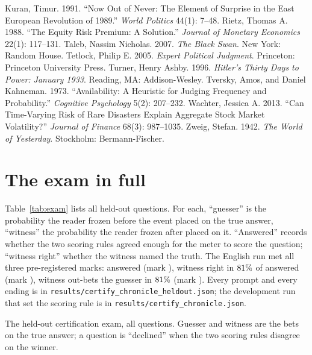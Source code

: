 \documentclass[11pt]{article}
\begin{document}
\begin{thebibliography}{99}
 Kuran, Timur. 1991. ``Now Out of Never: The Element of Surprise in the East
European Revolution of 1989.'' \emph{World Politics} 44(1): 7--48.
 Rietz, Thomas A. 1988. ``The Equity Risk Premium: A Solution.''
\emph{Journal of Monetary Economics} 22(1): 117--131.
 Taleb, Nassim Nicholas. 2007. \emph{The Black Swan}. New York: Random House.
 Tetlock, Philip E. 2005. \emph{Expert Political Judgment}. Princeton:
Princeton University Press.
 Turner, Henry Ashby. 1996. \emph{Hitler's Thirty Days to Power: January
1933}. Reading, MA: Addison-Wesley.
 Tversky, Amos, and Daniel Kahneman. 1973. ``Availability:
A Heuristic for Judging Frequency and Probability.'' \emph{Cognitive Psychology} 5(2): 207--232.
 Wachter, Jessica A. 2013. ``Can Time-Varying Risk of Rare Disasters
Explain Aggregate Stock Market Volatility?'' \emph{Journal of Finance} 68(3): 987--1035.
 Zweig, Stefan. 1942. \emph{The World of Yesterday}. Stockholm:
Bermann-Fischer.
\end{thebibliography}

\clearpage
\appendix
\renewcommand{\thesection}{\Alph{section}}

\section{The exam in full}\label{app:exam}
Table~\ref{tab:exam} lists all \NexamTotal{} held-out questions. For each, ``guesser'' is the probability
the reader frozen before the event placed on the true answer, ``witness'' the probability the reader frozen
after placed on it. ``Answered'' records whether the two scoring rules agreed enough for the meter to score
the question; ``witness right'' whether the witness named the truth. The English run met all three
pre-registered marks: \NexamAnswered{} answered (mark \NbarAnswer{}), witness right in $81\%$
of answered (mark \NbarCorrect{}), witness out-bets the guesser in $81\%$ (mark \NbarOutbet{}).
Every prompt and every ending is in \texttt{results/certify\_chronicle\_heldout.json}; the development run
that set the scoring rule is in \texttt{results/certify\_chronicle.json}.

\begin{table}[h]\centering\small

\caption{The held-out certification exam, all \NexamTotal{} questions. Guesser and witness are the bets on
the true answer; a question is ``declined'' when the two scoring rules disagree on the winner.}
\label{tab:exam}
\end{table}
\end{document}
